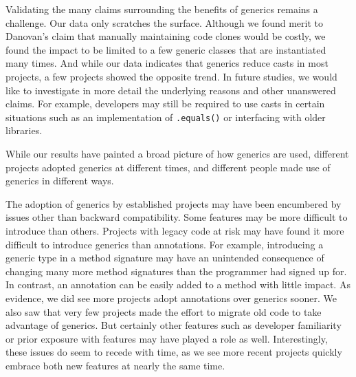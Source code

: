 \documentclass{svjour3}
\newcommand{\todo}[1]{}
\begin{document}



Validating the many claims surrounding the benefits of generics remains a challenge.
Our data only scratches the surface.  Although we found merit to Danovan's claim that manually maintaining code clones would be costly, 
we found the impact to be limited to a few generic classes that are instantiated many times.
And while our data indicates that generics reduce casts in most projects,
a few projects showed the opposite trend.  In future studies, we would like to investigate in more detail the underlying reasons and other unanswered claims.  For example, developers may still be required to use casts in certain situations such as an implementation of \texttt{.equals()} or interfacing with older libraries.


While our results have painted a broad picture of how generics are used,
different projects adopted generics at different times, and different
people made use of generics in different ways.


The adoption of generics by established projects may have been encumbered by issues other than backward compatibility.
Some features may be more difficult to introduce than others.
Projects with legacy code at risk may have found it more difficult to introduce generics than annotations.
For example, introducing a generic type in a method signature may have an unintended consequence of changing many more method signatures than the programmer had signed up for.  In contrast, an annotation can be easily added to a method with little impact.
As evidence, we did see more projects adopt annotations over generics sooner.  
We also saw that very few projects made the effort to migrate old code to take advantage of generics.
But certainly other features such as developer familiarity or prior exposure with features may have played a role as well.
Interestingly, these issues do seem to recede with time, as we see more recent projects quickly embrace both new features at nearly the same time.
\end{document}
